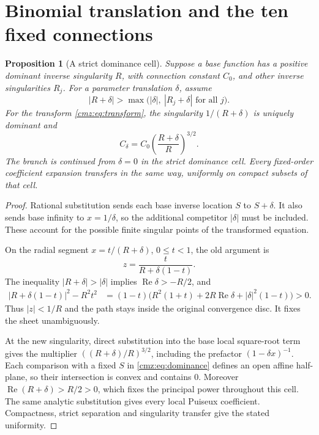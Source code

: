 \documentclass[11pt,letterpaper]{article}
\numberwithin{equation}{section}
\newtheorem{proposition}[theorem]{Proposition}
\theoremstyle{definition}\newtheorem{definition}[theorem]{Definition}
\theoremstyle{remark}\newtheorem{remark}[theorem]{Remark}
\DeclareMathOperator{\Rea}{Re}
\begin{document}
\section{Binomial translation and the ten fixed connections}
\label{cmz:sec:ten}
\begin{proposition}[A strict dominance cell]
\label{cmz:prop:translate}
Suppose a base function has a positive dominant inverse singularity $R$, with connection constant $C_0$, and other inverse singularities $R_j$. For a parameter translation $\delta$, assume
\begin{equation}
|R+\delta|>\max\bigl(|\delta|,\ |R_j+\delta|\text{ for all }j\bigr).
\label{cmz:eq:dominance}
\end{equation}
For the transform \eqref{cmz:eq:transform}, the singularity $1/(R+\delta)$ is uniquely dominant and
\begin{equation}
C_\delta=C_0\left(\frac{R+\delta}{R}\right)^{3/2}.
\label{cmz:eq:translatedC}
\end{equation}
The branch is continued from $\delta=0$ in the strict dominance cell. Every fixed-order coefficient expansion transfers in the same way, uniformly on compact subsets of that cell.
\end{proposition}
\begin{proof}
Rational substitution sends each base inverse location $S$ to $S+\delta$. It also sends base infinity to $x=1/\delta$, so the additional competitor $|\delta|$ must be included. These account for the possible finite singular points of the transformed equation.

On the radial segment $x=t/(R+\delta)$, $0\leq t<1$, the old argument is
\[
z=\frac{t}{R+\delta(1-t)}.
\]
The inequality $|R+\delta|>|\delta|$ implies $\Rea\delta>-R/2$, and
\begin{align*}
|R+\delta(1-t)|^2-R^2t^2
&=(1-t)\bigl(R^2(1+t)+2R\Rea\delta+|\delta|^2(1-t)\bigr)>0.
\end{align*}
Thus $|z|<1/R$ and the path stays inside the original convergence disc. It fixes the sheet unambiguously.

At the new singularity, direct substitution into the base local square-root term gives the multiplier $((R+\delta)/R)^{3/2}$, including the prefactor $(1-\delta x)^{-1}$. Each comparison with a fixed $S$ in \eqref{cmz:eq:dominance} defines an open affine half-plane, so their intersection is convex and contains $0$. Moreover $\Rea(R+\delta)>R/2>0$, which fixes the principal power throughout this cell. The same analytic substitution gives every local Puiseux coefficient. Compactness, strict separation and singularity transfer give the stated uniformity.
\end{proof}
\end{document}
